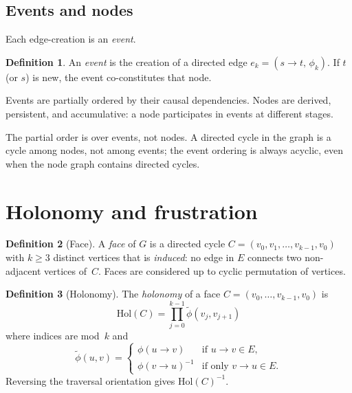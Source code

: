 \documentclass[11pt,a4paper]{article}
\theoremstyle{definition}
\newtheorem{definition}{Definition}[section]
\theoremstyle{plain}
\theoremstyle{remark}
\newcommand{\Hol}{\mathrm{Hol}}
\begin{document}
\subsection{Events and nodes}\label{sec:events}

Each edge-creation is an \emph{event}.

\begin{definition}\label{def:event}
  An \emph{event} is the creation of a directed edge $e_k = (s \to t,\, \phi_k)$.  If $t$ (or $s$) is new, the event co-constitutes that node.
\end{definition}

Events are partially ordered by their causal dependencies.  Nodes are derived, persistent, and accumulative: a node participates in events at different stages.

The partial order is over events, not nodes.  A directed cycle in the graph is a cycle among nodes, not among events; the event ordering is always acyclic, even when the node graph contains directed cycles.

\section{Holonomy and frustration}\label{sec:holonomy}

\begin{definition}[Face]\label{def:face}
  A \emph{face} of $G$ is a directed cycle $C = (v_0, v_1, \ldots, v_{k-1}, v_0)$ with $k \geq 3$ distinct vertices that is \emph{induced}: no edge in $E$ connects two non-adjacent vertices of~$C$.  Faces are considered up to cyclic permutation of vertices.
\end{definition}

\begin{definition}[Holonomy]\label{def:hol}
  The \emph{holonomy} of a face $C = (v_0, \ldots, v_{k-1}, v_0)$ is
  \begin{equation}\label{eq:hol}
    \Hol(C) = \prod_{j=0}^{k-1} \tilde{\phi}(v_j, v_{j+1})
  \end{equation}
  where indices are mod~$k$ and
  \[
    \tilde{\phi}(u, v) =
    \begin{cases}
      \phi(u \to v) & \text{if } u \to v \in E, \\
      \phi(v \to u)^{-1} & \text{if only } v \to u \in E.
    \end{cases}
  \]
  Reversing the traversal orientation gives $\Hol(C)^{-1}$.
\end{definition}
\end{document}
